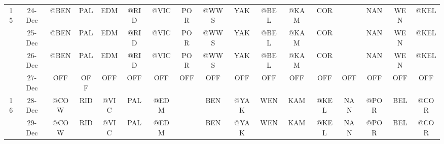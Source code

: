 \begin{table}[htbp]
\begin{tabular}{ccrrrrrrrrrrrrrrr}
    15    & 24-Dec & \multicolumn{1}{c}{\cellcolor[rgb]{ .588,  .588,  .588}@BEN} & \multicolumn{1}{c}{PAL} & \multicolumn{1}{c}{EDM} & \multicolumn{1}{c}{@RID} & \multicolumn{1}{c}{@VIC} & \multicolumn{1}{c}{POR} & \multicolumn{1}{c}{@WWS} & \multicolumn{1}{c}{YAK} & \multicolumn{1}{c}{\cellcolor[rgb]{ .588,  .588,  .588}@BEL} & \multicolumn{1}{c}{@KAM} & \multicolumn{1}{c}{COR} &       & \multicolumn{1}{c}{NAN} & \multicolumn{1}{c}{WEN} & \multicolumn{1}{c}{@KEL} \\
          & 25-Dec & \multicolumn{1}{c}{\cellcolor[rgb]{ .588,  .588,  .588}@BEN} & \multicolumn{1}{c}{PAL} & \multicolumn{1}{c}{EDM} & \multicolumn{1}{c}{@RID} & \multicolumn{1}{c}{@VIC} & \multicolumn{1}{c}{POR} & \multicolumn{1}{c}{@WWS} & \multicolumn{1}{c}{YAK} & \multicolumn{1}{c}{\cellcolor[rgb]{ .588,  .588,  .588}@BEL} & \multicolumn{1}{c}{@KAM} & \multicolumn{1}{c}{COR} &       & \multicolumn{1}{c}{NAN} & \multicolumn{1}{c}{WEN} & \multicolumn{1}{c}{@KEL} \\
          & 26-Dec & \multicolumn{1}{c}{\cellcolor[rgb]{ .588,  .588,  .588}@BEN} & \multicolumn{1}{c}{PAL} & \multicolumn{1}{c}{EDM} & \multicolumn{1}{c}{@RID} & \multicolumn{1}{c}{@VIC} & \multicolumn{1}{c}{POR} & \multicolumn{1}{c}{@WWS} & \multicolumn{1}{c}{YAK} & \multicolumn{1}{c}{\cellcolor[rgb]{ .588,  .588,  .588}@BEL} & \multicolumn{1}{c}{@KAM} & \multicolumn{1}{c}{COR} &       & \multicolumn{1}{c}{NAN} & \multicolumn{1}{c}{WEN} & \multicolumn{1}{c}{@KEL} \\
          & 27-Dec & \multicolumn{1}{c}{OFF} & \multicolumn{1}{c}{OFF} & \multicolumn{1}{c}{OFF} & \multicolumn{1}{c}{OFF} & \multicolumn{1}{c}{OFF} & \multicolumn{1}{c}{OFF} & \multicolumn{1}{c}{OFF} & \multicolumn{1}{c}{OFF} & \multicolumn{1}{c}{OFF} & \multicolumn{1}{c}{OFF} & \multicolumn{1}{c}{OFF} & \multicolumn{1}{c}{OFF} & \multicolumn{1}{c}{OFF} & \multicolumn{1}{c}{OFF} & \multicolumn{1}{c}{OFF} \\
    16    & 28-Dec & \multicolumn{1}{c}{@COW} & \multicolumn{1}{c}{RID} & \multicolumn{1}{c}{@VIC} & \multicolumn{1}{c}{PAL} & \multicolumn{1}{c}{@EDM} &       & \multicolumn{1}{c}{BEN} & \multicolumn{1}{c}{@YAK} & \multicolumn{1}{c}{WEN} & \multicolumn{1}{c}{KAM} & \multicolumn{1}{c}{@KEL} & \multicolumn{1}{c}{NAN} & \multicolumn{1}{c}{@POR} & \multicolumn{1}{c}{BEL} & \multicolumn{1}{c}{@COR} \\
          & 29-Dec & \multicolumn{1}{c}{@COW} & \multicolumn{1}{c}{RID} & \multicolumn{1}{c}{@VIC} & \multicolumn{1}{c}{PAL} & \multicolumn{1}{c}{@EDM} &       & \multicolumn{1}{c}{BEN} & \multicolumn{1}{c}{@YAK} & \multicolumn{1}{c}{WEN} & \multicolumn{1}{c}{KAM} & \multicolumn{1}{c}{@KEL} & \multicolumn{1}{c}{NAN} & \multicolumn{1}{c}{@POR} & \multicolumn{1}{c}{BEL} & \multicolumn{1}{c}{@COR} \\

\end{tabular}
\end{table}
